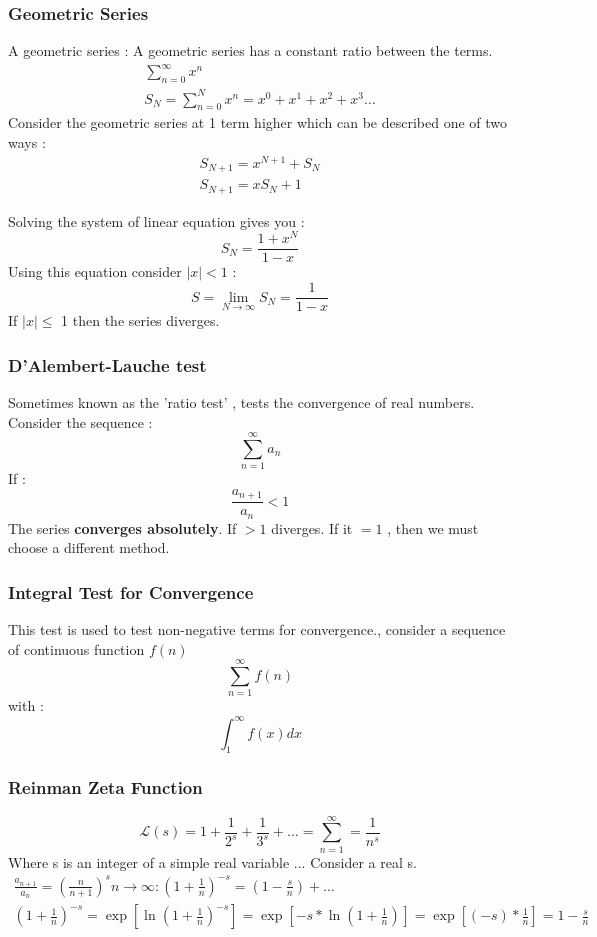 \documentclass{article}
\newcommand{\be}{\begin{equation}}
\newcommand{\ee}{\end{equation}}
\begin{document}
\subsubsection*{Geometric Series}
A geometric series :
A geometric series has a constant ratio between the terms.
\be
\begin{split}
\sum_{n=0}^{\infty}x^n  \\
S_N = \sum_{n=0}^{N} x^n = x^0 +x^1 + x^2 + x^3 \hdots
\end{split}
\ee
Consider the geometric series at 1 term higher which can be described one of two ways :
\be
\begin{split}
S_{N+1} = x^{N+1} + S_N \\
S_{N+1} = xS_N + 1
\end{split}
\ee

Solving the system of linear equation gives you :
\be
S_N = \frac{1+x^N}{1-x}
\ee
Using this equation consider $|x| < 1$ :
\be
S = \lim_{N \to \infty}S_N = \frac{1}{1-x}
\ee
If $|x|\leq$ 1 then the series diverges.
\subsubsection*{D'Alembert-Lauche test}
Sometimes known as the 'ratio test' , tests the convergence of real numbers. Consider the sequence :
\be
\sum_{n=1}^{\infty}a_n
\ee
If :
\be
\frac{a_{n+1}}{a_n} < 1
\ee
The series \textbf{converges absolutely}. If $>1$ diverges.
If it $=1$ , then we must choose a different method.
\subsubsection*{Integral Test for Convergence}
This test is used to test non-negative terms for convergence., consider a sequence of continuous function $f(n)$
\be
\sum_{n=1}^{\infty} f(n)
\ee
with :
\be
\int_{1}^{\infty}f(x)dx
\ee
\subsubsection*{Reinman Zeta Function}
\be
\mathcal{L}(s) = 1 + \frac{1}{2^s} + \frac{1}{3^s}+ \hdots = \sum_{n=1}^{\infty} = \frac{1}{n^s}
\ee
Where s is an integer of a simple real variable ...
Consider a real s.
\be
\begin{split}
\frac{a_{n+1}}{a_n}= \left(\frac{n}{n+1}\right)^s {n \to \infty}:  \left(1+\frac{1}{n}\right)^{-s} = \left( 1 - \frac{s}{n}\right)+ \hdots \\
\left(1 + \frac{1}{n}\right)^{-s} = \exp\left[{\ln{\left(1+\frac{1}{n}\right)^{-s}}}\right] = \exp\left[-s*{\ln{\left(1+\frac{1}{n}\right)^{}}}\right] = \exp\left[(-s)*\frac{1}{n}\right]=1 - \frac{s}{n}
\end{split}
\ee
\end{document}
